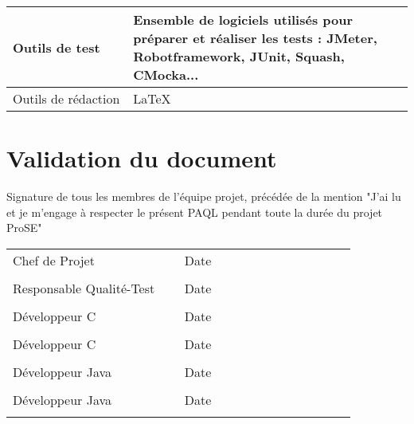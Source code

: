 \documentclass[a4paper,11pt,titlepage]{article}
\begin{document}
\begin{longtable}{|p{0.3\linewidth}|p{0.7\linewidth}|}
    Outils de test                                           & Ensemble de logiciels utilisés pour préparer et réaliser les tests : JMeter, Robotframework, JUnit, Squash, CMocka...                                                                            \\ \hline
    Outils de rédaction                                      & LaTeX                                                                                                                                                                                            \\ \hline
\end{longtable}

\newpage
\section{Validation du document}
Signature de tous les membres de l'équipe projet, précédée de la mention "J'ai lu et je m'engage à respecter le présent PAQL pendant toute la durée du projet ProSE"\\
\bigskip
\begin{longtable}[l]{p{0.45\linewidth}p{0.45\linewidth}}
    Chef de Projet           & Date     \\ [1\bigskipamount]
    \dotfill                 & \dotfill \\ [3\bigskipamount]
    Responsable Qualité-Test & Date     \\ [1\bigskipamount]
    \dotfill                 & \dotfill \\ [3\bigskipamount]
    Développeur C            & Date     \\ [1\bigskipamount]
    \dotfill                 & \dotfill \\ [3\bigskipamount]
    Développeur C            & Date     \\ [1\bigskipamount]
    \dotfill                 & \dotfill \\ [3\bigskipamount]
    Développeur Java         & Date     \\ [1\bigskipamount]
    \dotfill                 & \dotfill \\ [3\bigskipamount]
    Développeur Java         & Date     \\ [1\bigskipamount]
    \dotfill                 & \dotfill \\
\end{longtable}
\end{document}

